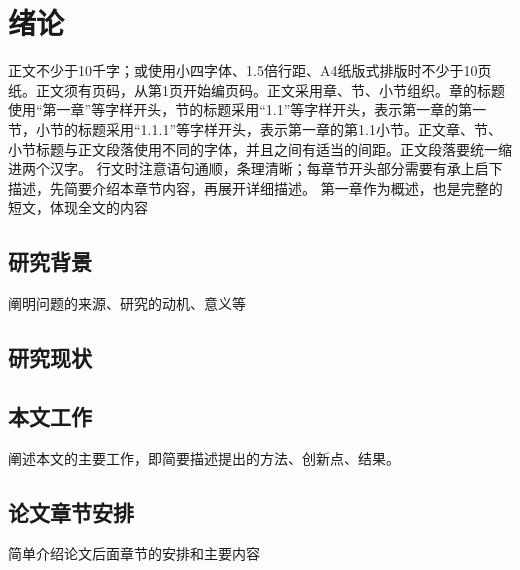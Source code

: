 \section{绪论}
正文不少于10千字；或使用小四字体、1.5倍行距、A4纸版式排版时不少于10页纸。正文须有页码，从第1页开始编页码。正文采用章、节、小节组织。章的标题使用“第一章”等字样开头，节的标题采用“1.1”等字样开头，表示第一章的第一节，小节的标题采用“1.1.1”等字样开头，表示第一章的第1.1小节。正文章、节、小节标题与正文段落使用不同的字体，并且之间有适当的间距。正文段落要统一缩进两个汉字。
行文时注意语句通顺，条理清晰；每章节开头部分需要有承上启下描述，先简要介绍本章节内容，再展开详细描述。
第一章作为概述，也是完整的短文，体现全文的内容
\subsection{研究背景}
阐明问题的来源、研究的动机、意义等
\subsection{研究现状}
\subsection{本文工作}
阐述本文的主要工作，即简要描述提出的方法、创新点、结果。
\subsection{论文章节安排}
简单介绍论文后面章节的安排和主要内容